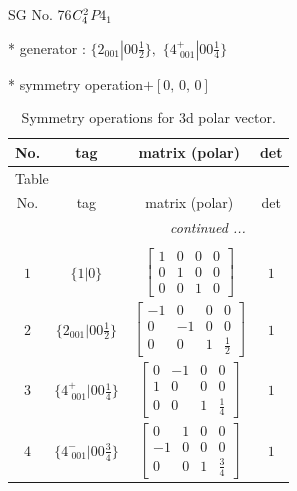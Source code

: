 \documentclass[fleqn,8pt]{jsarticle}
\begin{document}
\setcounter{MaxMatrixCols}{32}

\renewcommand{\tablename}{Table~}
\renewcommand{\figurename}{Figure~}
\begin{center}
\LARGE
SG No. 76\quad$C_{\rm 4}^{2}$\quad$P4_1$\quad[ tetragonal ]
\end{center}

* generator : $\{2{}_{001}|0 0 \frac{1}{2}\},\,\,\{4^{+}_{\,\,001}|0 0 \frac{1}{4}\}$

* symmetry operation\quad$+\left[ 0,\, 0,\, 0 \right]$
\renewcommand{\arraystretch}{1.3}
\begin{longtable}{cccc}
\caption{Symmetry operations for 3d polar vector.}
 \\
 \hline \hline
No. & tag & matrix (polar) & det \\ \hline \endfirsthead

\multicolumn{3}{l}{\tablename\ \thetable{}} \\
 \hline \hline
No. & tag & matrix (polar) & det \\ \hline \endhead

 \hline \hline
\multicolumn{3}{r}{\footnotesize\it continued ...} \\ \endfoot

 \hline \hline
\multicolumn{3}{r}{} \\ \endlastfoot

$ 1 $ & $ \{1|0\} $ & $ \begin{bmatrix} 1 & 0 & 0 & 0 \\ 0 & 1 & 0 & 0 \\ 0 & 0 & 1 & 0 \end{bmatrix} $ & $ 1 $ \\ \hline
$ 2 $ & $ \{2{}_{001}|0 0 \frac{1}{2}\} $ & $ \begin{bmatrix} -1 & 0 & 0 & 0 \\ 0 & -1 & 0 & 0 \\ 0 & 0 & 1 & \frac{1}{2} \end{bmatrix} $ & $ 1 $ \\ \hline
$ 3 $ & $ \{4^{+}_{\,\,001}|0 0 \frac{1}{4}\} $ & $ \begin{bmatrix} 0 & -1 & 0 & 0 \\ 1 & 0 & 0 & 0 \\ 0 & 0 & 1 & \frac{1}{4} \end{bmatrix} $ & $ 1 $ \\ \hline
$ 4 $ & $ \{4^{-}_{\,\,001}|0 0 \frac{3}{4}\} $ & $ \begin{bmatrix} 0 & 1 & 0 & 0 \\ -1 & 0 & 0 & 0 \\ 0 & 0 & 1 & \frac{3}{4} \end{bmatrix} $ & $ 1 $ \\
\end{longtable}
\end{document}
